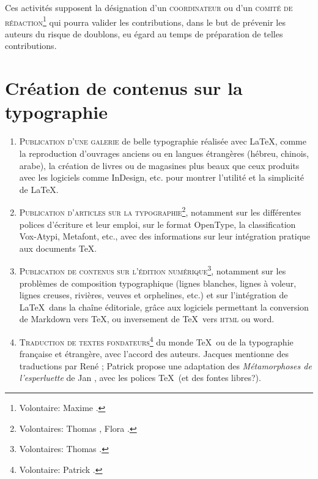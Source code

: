 \documentclass{tufte-handout}
\newcommand{\ratio}[3][]{\marginpar{\footnotesize{\textcolor{teal}{Temps requis: #2 / Utilité: #3}\par\noindent \textcolor{teal}{#1}}}}
\begin{document}
Ces activités supposent la désignation d'un \textsc{coordinateur}\ratio[Potentiellement chronophage]{++}{++} ou d'un \textsc{comité de rédaction}\footnote{Volontaire: Maxime .} qui pourra valider les contributions, dans le but de prévenir les auteurs du risque de doublons, eu égard au temps de préparation de telles contributions.


\section{Création de contenus sur la typographie}

\begin{enumerate}
	\item\textsc{Publication d'une galerie}\ratio[Les documents existent]{+}{+++} de belle typographie réalisée avec \LaTeX, comme la reproduction d'ouvrages anciens ou en langues étrangères (hébreu, chinois, arabe), la création de livres ou de magasines plus beaux que ceux produits avec les logiciels comme InDesign, etc. pour montrer l'utilité et la simplicité de \LaTeX.
	\item\textsc{Publication d'articles sur la typographie}\ratio[Individuellement assez peu chronophage, d'autant que certaines ressources existent]{++}{++}\footnote{Volontaires: Thomas , Flora .}, notamment sur les différentes polices d'écriture et leur emploi, sur le format OpenType, la classification Vox-Atypi, Metafont, etc., avec des informations sur leur intégration pratique aux documents \TeX.
	\item\textsc{Publication de contenus sur l'édition numérique}\ratio[Individuellement assez peu chronophage, d'autant que certaines ressources existent]{++}{++}\footnote{Volontaires: Thomas .}, notamment sur les problèmes de composition typographique (lignes blanches, lignes à voleur, lignes creuses, rivières, veuves et orphelines, etc.) et sur l'intégration de \LaTeX\ dans la chaîne éditoriale, grâce aux logiciels permettant la conversion de Markdown vers \TeX, ou inversement de \TeX\ vers \textsc{html} ou word.
	\item\textsc{Traduction de textes fondateurs}\ratio[Chronophage]{+++}{+}\footnote{Volontaire: Patrick .} du monde \TeX\ ou de la typographie française et étrangère, avec l'accord des auteurs. Jacques  mentionne des traductions par René ; Patrick  propose une adaptation des \emph{Métamorphoses de l'esperluette} de Jan , avec les polices \TeX~(et des fontes libres?).
\end{enumerate}
\end{document}

